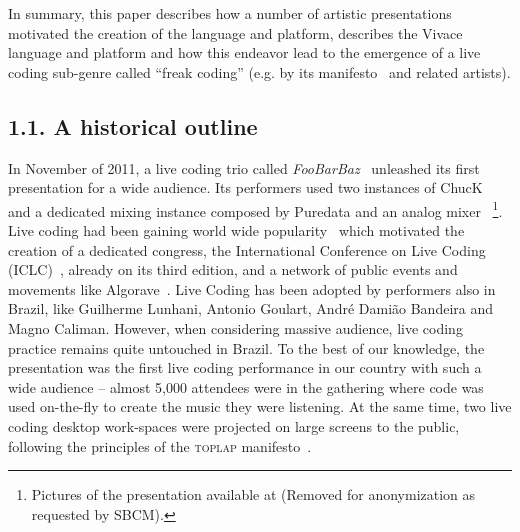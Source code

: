 \documentclass[12pt,times,twocolumn]{article}
\begin{document}
In summary, this paper describes how
a number of artistic presentations motivated the creation of the language and platform,
describes the Vivace language and platform and how this endeavor
lead to the emergence of a live coding sub-genre
called ``freak coding'' (e.g. by its manifesto~\cite{freak} and related artists).

\subsection{1.1. A historical outline} %
In November of 2011, a live coding trio called
\textit{FooBarBaz}~\cite{foobarbaz} unleashed its first presentation
for a wide audience. Its performers used two instances of
ChucK~\cite{wang2003chuck} and a dedicated mixing instance composed by Puredata and an analog
mixer
~\footnote{Pictures of the presentation available at
  (Removed for anonymization as requested by SBCM).}.
  Live coding had been gaining world wide popularity~\cite{nilson2007live,
  collins2003live, brown2007a, collins2011live} which motivated the creation of a dedicated
  congress, the International Conference on Live Coding (ICLC)~\cite{iclc},
  already on its third edition, and a network of
  public events and movements like Algorave~\cite{algorave}. Live Coding has been adopted by
  performers also in Brazil, like Guilherme Lunhani, Antonio Goulart, André
  Damião Bandeira and Magno Caliman. However, when considering massive
  audience, live coding practice remains quite untouched in Brazil.
To the best of our knowledge, the presentation
was the first live coding performance in our country with such a wide audience -- almost 5,000
attendees were in the gathering where code was used on-the-fly to
create the music they were listening.
At the same time, two live coding desktop work-spaces were projected on large screens to the
public, following the principles of the \textsc{toplap} manifesto~\cite{ward2004live}.
\end{document}
